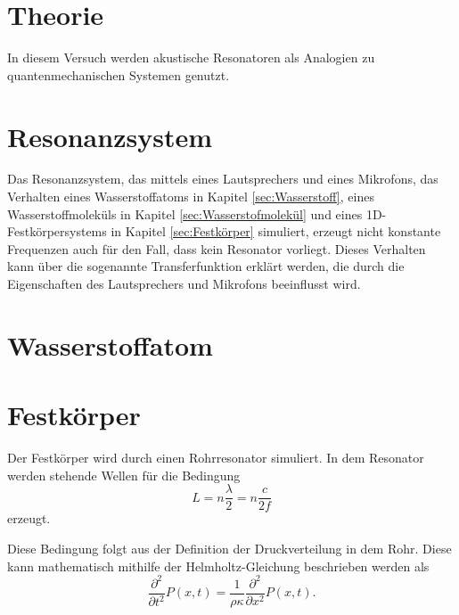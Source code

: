 \section{Theorie}
\label{sec:Theorie}

In diesem Versuch werden akustische Resonatoren als Analogien zu quantenmechanischen Systemen genutzt. 

\section{Resonanzsystem}

Das Resonanzsystem, das mittels eines Lautsprechers und eines Mikrofons, das Verhalten eines Wasserstoffatoms in Kapitel \ref{sec:Wasserstoff}, eines Wasserstoffmoleküls in Kapitel \ref{sec:Wasserstofmolekül} und eines 1D-Festkörpersystems in Kapitel \ref{sec:Festkörper} simuliert, erzeugt nicht konstante Frequenzen auch für den Fall, dass kein Resonator vorliegt.
Dieses Verhalten kann über die sogenannte Transferfunktion erklärt werden, die durch die Eigenschaften des Lautsprechers und Mikrofons beeinflusst wird. 


\section{Wasserstoffatom}


\section{Festkörper}

Der Festkörper wird durch einen Rohrresonator simuliert. In dem Resonator werden stehende Wellen für die Bedingung 
\begin{equation*}
    L = n \frac{\lambda}{2} = n \frac{c}{2f}
\end{equation*}
erzeugt. 

Diese Bedingung folgt aus der Definition der Druckverteilung in dem Rohr. Diese kann mathematisch mithilfe der Helmholtz-Gleichung beschrieben werden als 
\begin{equation*}
    \frac{\partial^2}{\partial t^2} P(x,t) = \frac{1}{\rho\kappa}\frac{\partial^2}{\partial x^2} P(x,t).
\end{equation*}

